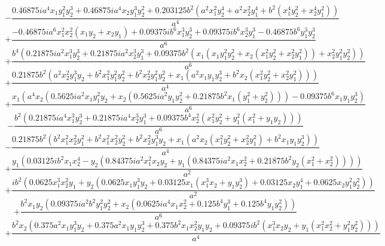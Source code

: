 $$- \frac{0.46875 i a^{4} x_{1} y_{1}^{2} y_{2}^{3} + 0.46875 i a^{4} x_{2} y_{1}^{3} y_{2}^{2} + 0.203125 b^{2} \left(a^{2} x_{1}^{2} y_{2}^{4} + a^{2} x_{2}^{2} y_{1}^{4} + b^{2} \left(x_{1}^{4} y_{2}^{2} + x_{2}^{4} y_{1}^{2}\right)\right)}{a^{4}}$$
$$+\frac{- 0.46875 i a^{6} x_{1}^{2} x_{2}^{2} \left(x_{1} y_{2} + x_{2} y_{1}\right) + 0.09375 i b^{6} x_{1}^{3} y_{2}^{3} + 0.09375 i b^{6} x_{2}^{3} y_{1}^{3} - 0.46875 b^{6} y_{1}^{3} y_{2}^{3}}{a^{6}}$$
$$+\frac{b^{4} \left(0.21875 i a^{2} x_{1}^{3} y_{2}^{3} + 0.21875 i a^{2} x_{2}^{3} y_{1}^{3} + 0.09375 b^{2} \left(x_{1} \left(x_{1} y_{1}^{2} y_{2}^{2} + x_{2} \left(x_{1}^{2} y_{2}^{2} + x_{2}^{2} y_{1}^{2}\right)\right) + x_{2}^{2} y_{1}^{2} y_{2}^{2}\right)\right)}{a^{6}}$$
$$+\frac{0.21875 b^{2} \left(a^{2} x_{2}^{2} y_{1}^{3} y_{2} + b^{2} x_{1}^{2} y_{1}^{2} y_{2}^{2} + b^{2} x_{2}^{2} y_{1}^{2} y_{2}^{2} + x_{1} \left(a^{2} x_{1} y_{1} y_{2}^{3} + b^{2} x_{2} \left(x_{1}^{2} y_{2}^{2} + x_{2}^{2} y_{1}^{2}\right)\right)\right)}{a^{4}}$$
$$+\frac{x_{1} \left(a^{4} x_{2} \left(0.5625 i a^{2} x_{1} y_{1}^{2} y_{2} + x_{2} \left(0.5625 i a^{2} y_{1} y_{2}^{2} + 0.21875 b^{2} x_{1} \left(y_{1}^{2} + y_{2}^{2}\right)\right)\right) - 0.09375 b^{6} x_{1} y_{1} y_{2}^{3}\right)}{a^{6}}$$
$$- \frac{b^{2} \left(0.21875 i a^{4} x_{1}^{3} y_{2}^{3} + 0.21875 i a^{4} x_{2}^{3} y_{1}^{3} + 0.09375 b^{4} x_{2}^{2} \left(x_{1}^{2} y_{2}^{2} + y_{1}^{2} \left(x_{1}^{2} + y_{1} y_{2}\right)\right)\right)}{a^{6}}$$
$$- \frac{0.21875 b^{2} \left(b^{2} x_{1}^{2} x_{2}^{2} y_{1}^{2} + b^{2} x_{1}^{2} x_{2}^{2} y_{2}^{2} + b^{2} x_{2}^{2} y_{1}^{3} y_{2} + x_{1} \left(a^{2} x_{2} \left(x_{1}^{2} y_{2}^{2} + x_{2}^{2} y_{1}^{2}\right) + b^{2} x_{1} y_{1} y_{2}^{3}\right)\right)}{a^{4}}$$
$$+\frac{y_{1} \left(0.03125 i b^{2} x_{1} x_{2}^{4} - y_{2} \left(0.84375 i a^{2} x_{1}^{2} x_{2} y_{2} + y_{1} \left(0.84375 i a^{2} x_{1} x_{2}^{2} + 0.21875 b^{2} y_{2} \left(x_{1}^{2} + x_{2}^{2}\right)\right)\right)\right)}{a^{2}}$$
$$+\frac{i b^{2} \left(0.0625 x_{1}^{3} x_{2}^{2} y_{1} + y_{2} \left(0.0625 x_{1} y_{1}^{3} y_{2} + 0.03125 x_{1} \left(x_{1}^{3} x_{2} + y_{1} y_{2}^{3}\right) + 0.03125 x_{2} y_{1}^{4} + 0.0625 x_{2} y_{1}^{2} y_{2}^{2}\right)\right)}{a^{2}}$$
$$+\frac{b^{2} x_{1} y_{2} \left(0.09375 i a^{2} b^{2} y_{1}^{2} y_{2}^{2} + x_{2} \left(0.0625 i a^{4} x_{1} x_{2}^{2} + 0.125 b^{4} y_{1}^{3} + 0.125 b^{4} y_{1} y_{2}^{2}\right)\right)}{a^{6}}$$
$$+\frac{b^{2} x_{2} \left(0.375 a^{2} x_{1} y_{1}^{3} y_{2} + 0.375 a^{2} x_{1} y_{1} y_{2}^{3} + 0.375 b^{2} x_{1} x_{2}^{2} y_{1} y_{2} + 0.09375 i b^{2} \left(x_{1}^{3} x_{2} y_{2} + y_{1} \left(x_{1}^{2} x_{2}^{2} + y_{1}^{2} y_{2}^{2}\right)\right)\right)}{a^{4}}$$
